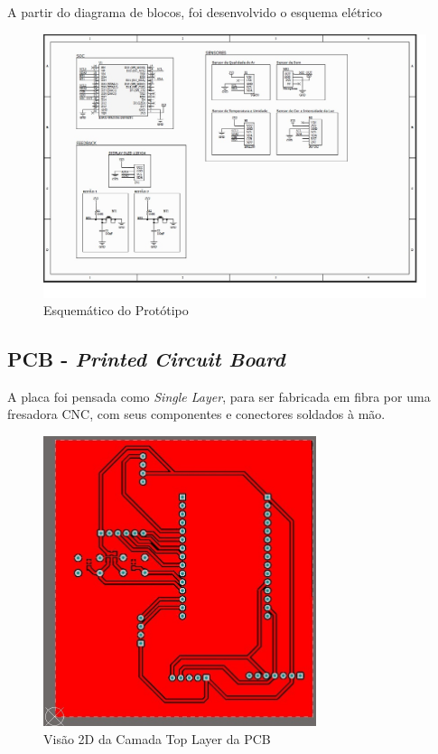 \documentclass[../monografia.tex]{subfiles}
\begin{document}
A partir do diagrama de blocos, foi desenvolvido o esquema elétrico

\begin{figure}[h]
\includegraphics[width=\textwidth]{sch}
\caption{Esquemático do Protótipo}
\label{fig:img2}
\end{figure}

\subsection{PCB - \textit{Printed Circuit Board}}

A placa foi pensada como \textit{Single Layer}, para ser fabricada em fibra por uma fresadora CNC, com seus componentes e conectores soldados à mão. 

\begin{figure}[h]
\centering
\includegraphics[width=8cm]{pcb_2}
\caption{Visão 2D da Camada Top Layer da PCB}
\label{fig:img3}
\end{figure}
\end{document}
